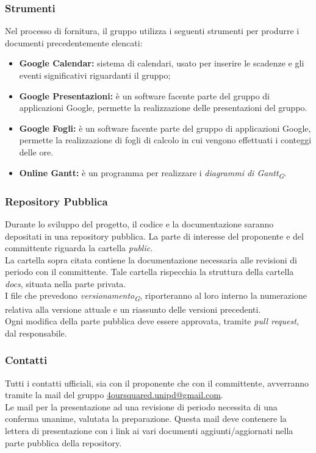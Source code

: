 \documentclass[a4paper, 12pt]{article}
\begin{document}
\subsubsection{Strumenti}
Nel processo di fornitura, il gruppo utilizza i seguenti strumenti per produrre
i documenti precedentemente elencati:
\begin{itemize}
    \item \textbf{Google Calendar:} sistema di calendari, usato per inserire le
    scadenze e gli eventi significativi riguardanti il gruppo;
    \item \textbf{Google Presentazioni:} è un
    software facente parte del gruppo di applicazioni Google, permette la
    realizzazione delle presentazioni del gruppo.
    \item \textbf{Google Fogli:} è un software facente parte del gruppo di
    applicazioni Google, permette la realizzazione di fogli di calcolo in cui
    vengono effettuati i conteggi delle ore. 
    \item \textbf{Online Gantt:} è un programma per realizzare i \textit{diagrammi di
    Gantt}\textsubscript{\textit{G}}.
\end{itemize}

\subsubsection{Repository Pubblica}
Durante lo sviluppo del progetto, il codice e la documentazione saranno depositati in una repository pubblica. La parte di interesse del proponente e del committente riguarda la cartella \textit{public}. \\
La cartella sopra citata contiene la documentazione necessaria alle revisioni di periodo con il committente. Tale cartella rispecchia la struttura della cartella \textit{docs}, situata nella parte privata. \\
I file che prevedono \textit{versionamento\textsubscript{G}}, riporteranno al loro interno la numerazione relativa alla versione attuale e un riassunto delle versioni precedenti. \\ 
Ogni modifica della parte pubblica deve essere approvata, tramite \textit{pull request}, dal responsabile.

\subsubsection{Contatti}
Tutti i contatti ufficiali, sia con il proponente che con il committente, avverranno tramite la mail del gruppo \href{mailto:4oursquared.unipd@gmail.com}{4oursquared.unipd@gmail.com}.\\
Le mail per la presentazione ad una revisione di periodo necessita di una conferma unanime, valutata la preparazione. Questa mail deve contenere la lettera di presentazione con i link ai vari documenti aggiunti/aggiornati nella parte pubblica della repository.
\end{document}
